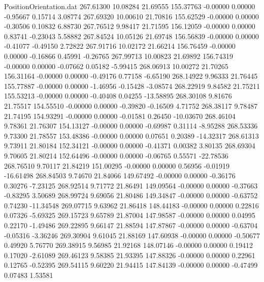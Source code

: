 \begin{filecontents}{PositionOrientation.dat}
 267.61300   10.08284   21.69555   155.37763   -0.00000    0.00000   -0.95667    0.15714    3.08774
 267.69320   10.00610   21.70816   155.62529   -0.00000    0.00000   -0.30506    0.10832    6.88730
 267.76512    9.98417   21.71595   156.12059   -0.00000    0.00000    0.83741   -0.23043    5.58882
 267.84524   10.05126   21.69748   156.56839   -0.00000    0.00000   -0.41077   -0.49150    2.72822
 267.91716   10.02172   21.66214   156.76459   -0.00000    0.00000   -0.16866    0.45991   -0.26765
 267.99713   10.00823   21.69892   156.74319   -0.00000    0.00000   -0.07662    0.05182   -5.99415
 268.06913   10.00272   21.70265   156.31164   -0.00000    0.00000   -0.49176    0.77158   -6.65190
 268.14922    9.96333   21.76445   155.77887   -0.00000    0.00000   -1.46956   -0.15428   -3.08574
 268.22919    9.84582   21.75211   155.53213   -0.00000    0.00000   -0.40408    0.04255  -13.58895
 268.30108    9.81676   21.75517   154.55510   -0.00000    0.00000   -0.39820   -0.16509    4.71752
 268.38117    9.78487   21.74195   154.93291   -0.00000    0.00000   -0.01581    0.26450  -10.03670
 268.46104    9.78361   21.76307   154.13127   -0.00000    0.00000   -0.69987    0.31114   -8.95288
 268.53336    9.73300   21.78557   153.48386   -0.00000    0.00000    0.07651    0.20389  -14.32317
 268.61313    9.73911   21.80184   152.34121   -0.00000    0.00000   -0.41371    0.00382    3.80135
 268.69304    9.70605   21.80214   152.64496   -0.00000    0.00000   -0.06765    0.55571  -22.78536
 268.76510    9.70117   21.84219   151.00295   -0.00000    0.00000    0.56956   -0.01919  -16.61498
 268.84503    9.74670   21.84066   149.67492   -0.00000    0.00000   -0.36176    0.30276   -7.23125
 268.92514    9.71772   21.86491   149.09564   -0.00000    0.00000   -0.37663   -0.83295    3.50689
 268.99724    9.69056   21.80486   149.34847   -0.00000    0.00000   -0.63752    0.74230  -11.34548
 269.07715    9.63962   21.86418   148.44183   -0.00000    0.00000    0.22816    0.07326   -5.69325
 269.15723    9.65789   21.87004   147.98587   -0.00000    0.00000    0.04995    0.22170   -1.49486
 269.22895    9.66147   21.88594   147.87867   -0.00000    0.00000   -0.63704   -0.05316   -3.36246
 269.30904    9.61045   21.88169   147.60938   -0.00000    0.00000   -0.50677    0.49920    5.76770
 269.38915    9.56985   21.92168   148.07146   -0.00000    0.00000    0.19412    0.17020   -2.61089
 269.46123    9.58385   21.93395   147.88326   -0.00000    0.00000    0.22961    0.12765   -0.52395
 269.54115    9.60220   21.94415   147.84139   -0.00000    0.00000   -0.47499    0.07483    1.53581

\end{filecontents}
